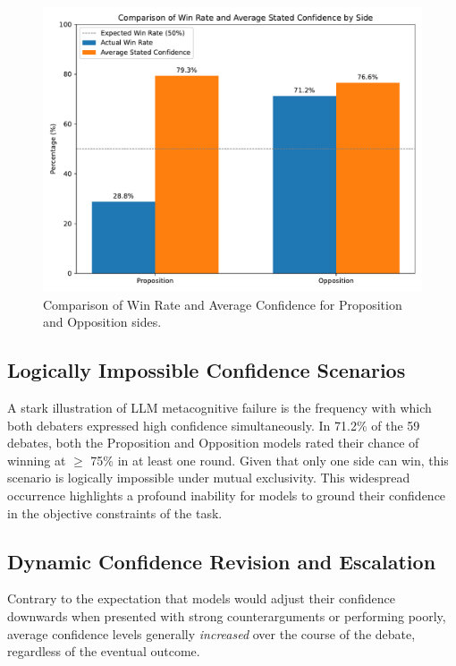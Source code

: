 \documentclass{article}
\begin{document}
\begin{figure}[h]
  \centering
  \includegraphics[width=0.8\linewidth]{figures/side_winrate_confidence_comparison.pdf}
  \caption{Comparison of Win Rate and Average Confidence for Proposition and Opposition sides.}
  \label{fig:position_bias}
\end{figure}

\subsection{Logically Impossible Confidence Scenarios}

A stark illustration of LLM metacognitive failure is the frequency with which both debaters expressed high confidence simultaneously. In 71.2\% of the 59 debates, both the Proposition and Opposition models rated their chance of winning at $\ge$ 75\% in at least one round. Given that only one side can win, this scenario is logically impossible under mutual exclusivity. This widespread occurrence highlights a profound inability for models to ground their confidence in the objective constraints of the task.


\subsection{Dynamic Confidence Revision and Escalation}

Contrary to the expectation that models would adjust their confidence downwards when presented with strong counterarguments or performing poorly, average confidence levels generally \textit{increased} over the course of the debate, regardless of the eventual outcome.
\end{document}
